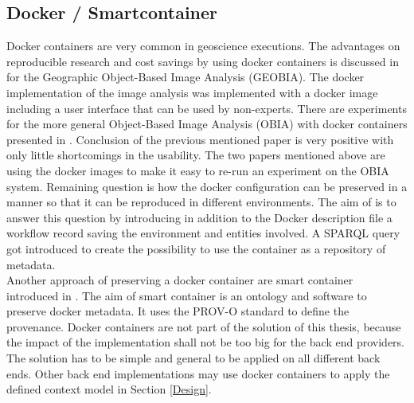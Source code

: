 \documentclass[draft,final]{vutinfth} %
\begin{document}
\subsection{Docker / Smartcontainer}\label{Smartcontainer}
Docker containers are very common in geoscience executions. The advantages on reproducible research and cost savings by using docker containers is discussed in \cite{rs9030290} for the Geographic Object-Based Image Analysis (GEOBIA). The docker implementation of the image analysis was implemented with a docker image including a user interface that can be used by non-experts. There are experiments for the more general Object-Based Image Analysis (OBIA) with docker containers presented in \cite{proceedings456}. Conclusion of the previous mentioned paper is very positive with only little shortcomings in the usability. The two papers mentioned above are using the docker images to make it easy to re-run an experiment on the OBIA system. Remaining question is how the docker configuration can be preserved in a manner so that it can be reproduced in different environments. The aim of \cite{emsley2017a} is to answer this question by introducing in addition to the Docker description file a workflow record saving the environment and entities involved. A SPARQL query got introduced to create the possibility to use the container as a repository of metadata.\\ 
Another approach of preserving a docker container are smart container introduced in \cite{Huo2015SmartCA}. The aim of smart container is an ontology and software to preserve docker metadata. It uses the PROV-O standard to define the provenance. 
Docker containers are not part of the solution of this thesis, because the impact of the implementation shall not be too big for the back end providers. The solution has to be simple and general to be applied on all different back ends. Other back end implementations may use docker containers to apply the defined context model in Section \ref{Design}.
\end{document}
